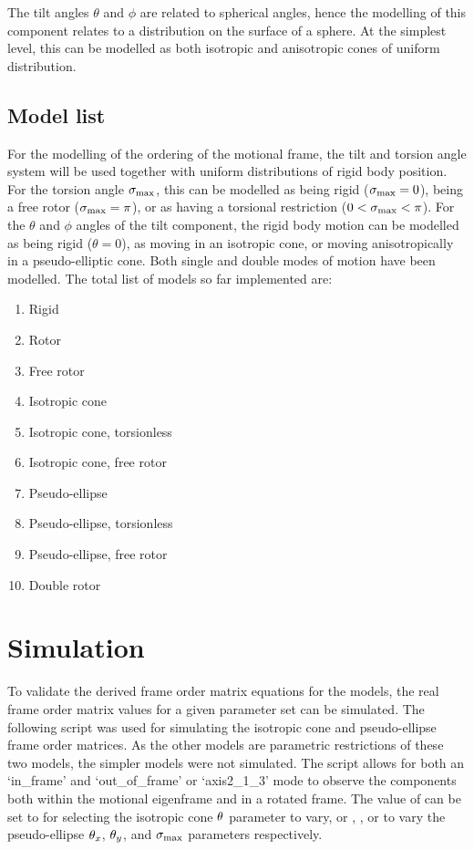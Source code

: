 The tilt angles $\theta$ and $\phi$ are related to spherical angles, hence the modelling of this component relates to a distribution on the surface of a sphere.
At the simplest level, this can be modelled as both isotropic and anisotropic cones of uniform distribution.





\subsection{Model list}

For the modelling of the ordering of the motional frame, the tilt and torsion angle system will be used together with uniform distributions of rigid body position.
For the torsion angle $\sigma_\textrm{max}$, this can be modelled as being rigid ($\sigma_\textrm{max} = 0$), being a free rotor ($\sigma_\textrm{max} = \pi$), or as having a torsional restriction ($0 < \sigma_\textrm{max} < \pi$).
For the $\theta$ and $\phi$ angles of the tilt component, the rigid body motion can be modelled as being rigid ($\theta = 0$), as moving in an isotropic cone, or moving anisotropically in a pseudo-elliptic cone.
Both single and double modes of motion have been modelled.
The total list of models so far implemented are:
\begin{enumerate}
    \item Rigid
    \item Rotor
    \item Free rotor
    \item Isotropic cone
    \item Isotropic cone, torsionless
    \item Isotropic cone, free rotor
    \item Pseudo-ellipse
    \item Pseudo-ellipse, torsionless
    \item Pseudo-ellipse, free rotor
    \item Double rotor
\end{enumerate}



\section{Simulation}
\label{sect: frame order simulation}

To validate the derived frame order matrix equations for the models, the real frame order matrix values for a given parameter set can be simulated.
The following script was used for simulating the isotropic cone and pseudo-ellipse frame order matrices.
As the other models are parametric restrictions of these two models, the simpler models were not simulated.
The script allows for both an `in\_frame' and `out\_of\_frame' or `axis2\_1\_3' mode to observe the components both within the motional eigenframe and in a rotated frame.
The value of  can be set to  for selecting the isotropic cone $\theta$ parameter to vary, or , , or  to vary the pseudo-ellipse $\theta_x$, $\theta_y$, and $\sigma_\textrm{max}$ parameters respectively.

